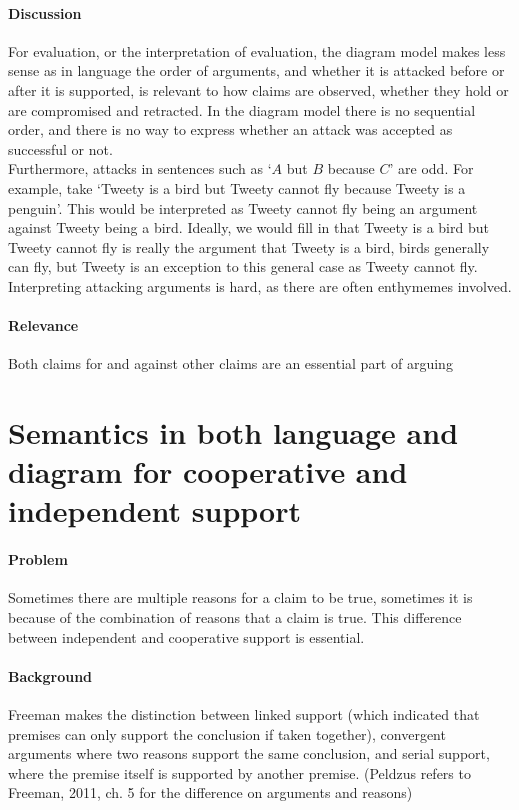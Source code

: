 \documentclass{article}
\let\stdsection\section
\renewcommand\section{\newpage\stdsection}
\begin{document}
\paragraph{Discussion} For evaluation, or the interpretation of evaluation, the diagram model makes less sense as in language the order of arguments, and whether it is attacked before or after it is supported, is relevant to how claims are observed, whether they hold or are compromised and retracted. In the diagram model there is no sequential order, and there is no way to express whether an attack was accepted as successful or not.\\
Furthermore, attacks in sentences such as `$A$ but $B$ because $C$' are odd. For example, take `Tweety is a bird but Tweety cannot fly because Tweety is a penguin'. This would be interpreted as Tweety cannot fly being an argument against Tweety being a bird. Ideally, we would fill in that Tweety is a bird but Tweety cannot fly is really the argument that Tweety is a bird, birds generally can fly, but Tweety is an exception to this general case as Tweety cannot fly. Interpreting attacking arguments is hard, as there are often enthymemes involved.
\paragraph{Relevance} Both claims for and against other claims are an essential part of arguing


\section{Semantics in both language and diagram for cooperative and independent support}

\paragraph{Problem} Sometimes there are multiple reasons for a claim to be true, sometimes it is because of the combination of reasons that a claim is true. This difference between independent and cooperative support is essential.
\paragraph{Background} Freeman makes the distinction between linked support (which indicated that premises can only support the conclusion if taken together), convergent arguments where two reasons support the same conclusion, and serial support, where the premise itself is supported by another premise. (Peldzus refers to Freeman, 2011, ch. 5 for the difference on arguments and reasons)
\end{document}
